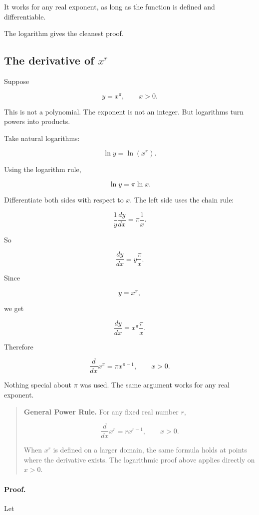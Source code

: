 It works for any real exponent, as long as the function is defined and differentiable.

The logarithm gives the cleanest proof.

\subsection{The derivative of \texorpdfstring{\(x^r\)}{x to the r}}
\label{subsec:derivative-x-to-r}

Suppose

\[
y=x^\pi,
\qquad x>0.
\]

This is not a polynomial.  The exponent is not an integer.  But logarithms turn powers into products.

Take natural logarithms:

\[
\ln y=\ln(x^\pi).
\]

Using the logarithm rule,

\[
\ln y=\pi\ln x.
\]

Differentiate both sides with respect to \(x\).  The left side uses the chain rule:

\[
\frac1y\frac{dy}{dx}=\pi\frac1x.
\]

So

\[
\frac{dy}{dx}=y\frac{\pi}{x}.
\]

Since

\[
y=x^\pi,
\]

we get

\[
\frac{dy}{dx}=x^\pi\frac{\pi}{x}.
\]

Therefore

\[
\boxed{
\frac{d}{dx}x^\pi=\pi x^{\pi-1},
\qquad x>0.
}
\]

Nothing special about \(\pi\) was used.  The same argument works for any real exponent.

\begin{quote}
\textbf{General Power Rule.}
For any fixed real number \(r\),

\[
\boxed{
\frac{d}{dx}x^r=rx^{r-1},
\qquad x>0.
}
\]

When \(x^r\) is defined on a larger domain, the same formula holds at points where the derivative exists.  The logarithmic proof above applies directly on \(x>0\).
\end{quote}

\paragraph{Proof.}
Let

